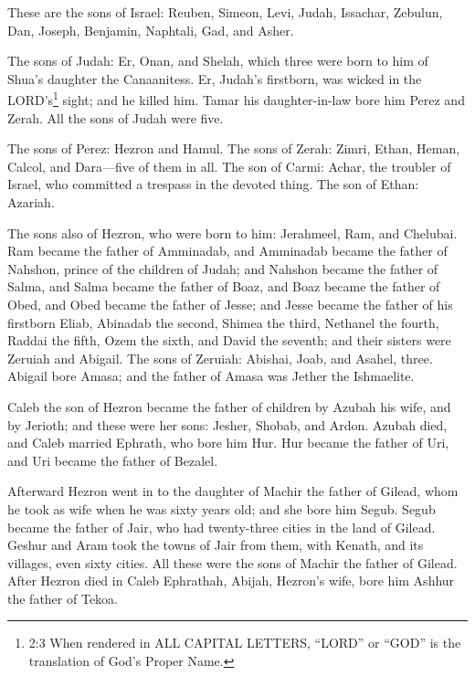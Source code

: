 \mychapter{} \myverse*{}These are the sons of Israel: Reuben, Simeon, Levi, Judah, Issachar,
Zebulun,
\myverse{}Dan, Joseph, Benjamin, Naphtali, Gad, and Asher.

\myverse{}The sons of Judah: Er, Onan, and Shelah, which three were born
to him of Shua’s daughter the Canaanitess. Er, Judah’s firstborn, was wicked in the LORD’s\footnote{2:3 When rendered in ALL CAPITAL LETTERS, “LORD” or “GOD” is the translation of God’s Proper Name.}
sight; and he killed him.
\myverse{}Tamar his daughter-in-law bore him Perez and Zerah. All the sons of Judah were
five.

\myverse{}The sons of Perez: Hezron and Hamul.
\myverse{}The sons of Zerah: Zimri, Ethan, Heman, Calcol, and Dara—five of them in all.
\myverse{}The son of Carmi: Achar, the troubler of Israel, who committed a trespass in
the devoted thing.
\myverse{}The son of Ethan: Azariah.

\myverse{}The sons also of Hezron, who were born to him: Jerahmeel, Ram,
and Chelubai.
\myverse{}Ram became the father of Amminadab, and Amminadab became the father of Nahshon,
prince of the children of Judah;
\myverse{}and Nahshon became the father of Salma, and Salma became the father of Boaz,
\myverse{}and Boaz became the father of Obed, and Obed became the father of Jesse;
\myverse{}and Jesse became the father of his firstborn Eliab, Abinadab the second, Shimea
the third,
\myverse{}Nethanel the fourth, Raddai the fifth,
\myverse{}Ozem the sixth, and David the seventh;
\myverse{}and their sisters were Zeruiah and Abigail. The sons of Zeruiah: Abishai,
Joab, and Asahel, three.
\myverse{}Abigail bore Amasa; and the father of Amasa was Jether the Ishmaelite.

\myverse{}Caleb the son of Hezron became the father of children by Azubah
his wife, and by Jerioth; and these were her sons: Jesher, Shobab, and Ardon.
\myverse{}Azubah died, and Caleb married Ephrath, who bore him Hur.
\myverse{}Hur became the father of Uri, and Uri became the father of Bezalel.

\myverse{}Afterward Hezron went in to the daughter of Machir the father
of Gilead, whom he took as wife when he was sixty years old; and she bore him Segub.
\myverse{}Segub became the father of Jair, who had twenty-three cities in the land of
Gilead.
\myverse{}Geshur and Aram took the towns of Jair from them, with Kenath, and its villages,
even sixty cities. All these were the sons of Machir the father of Gilead.
\myverse{}After Hezron died in Caleb Ephrathah, Abijah, Hezron’s wife, bore him Ashhur
the father of Tekoa.

